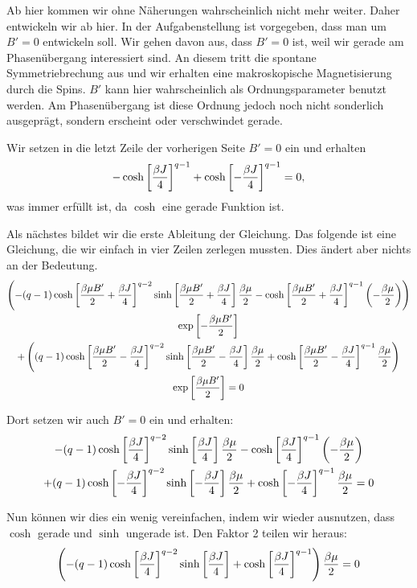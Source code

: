 Ab hier kommen wir ohne Näherungen wahrscheinlich nicht mehr weiter. Daher
entwickeln wir ab hier. In der Aufgabenstellung ist vorgegeben, dass man um $B'
= 0$ entwickeln soll. Wir gehen davon aus, dass $B' = 0$ ist, weil wir gerade
am Phasenübergang interessiert sind. An diesem tritt die spontane
Symmetriebrechung aus und wir erhalten eine makroskopische Magnetisierung durch
die Spins. $B'$ kann hier wahrscheinlich als Ordnungsparameter benutzt werden.
Am Phasenübergang ist diese Ordnung jedoch noch nicht sonderlich ausgeprägt,
sondern erscheint oder verschwindet gerade.

Wir setzen in die letzt Zeile der vorherigen Seite $B' = 0$ ein und erhalten
\[
    - \cosh\sbr{\frac{\beta J}4}^{q-1} + \cosh\sbr{-\frac{\beta J}4}^{q-1} = 0,
\]
was immer erfüllt ist, da $\cosh$ eine gerade Funktion ist.

Als nächstes bildet wir die erste Ableitung der Gleichung. Das folgende ist
eine Gleichung, die wir einfach in vier Zeilen zerlegen mussten. Dies ändert
aber nichts an der Bedeutung.
\begin{multline*}
    \del{
        - (q-1) \cosh\sbr{\frac{\beta \mu B'}2 + \frac{\beta J}4}^{q-2}
        \sinh\sbr{\frac{\beta \mu B'}2 + \frac{\beta J}4}
        \frac{\beta \mu}2
        - \cosh\sbr{\frac{\beta \mu B'}2 + \frac{\beta J}4}^{q-1}
        \del{- \frac{\beta \mu}2}
    } \\
    \exp\sbr{- \frac{\beta \mu B'}2} \\
    +
    \del{
        (q-1) \cosh\sbr{\frac{\beta \mu B'}2 - \frac{\beta J}4}^{q-2}
        \sinh\sbr{\frac{\beta \mu B'}2 - \frac{\beta J}4}
        \frac{\beta \mu}2
        + \cosh\sbr{\frac{\beta \mu B'}2 - \frac{\beta J}4}^{q-1}
        \frac{\beta \mu}2
    }
    \\
    \exp\sbr{\frac{\beta \mu B'}2}
    = 0
\end{multline*}

Dort setzen wir auch $B'=0$ ein und erhalten:
\begin{multline*}
    - (q-1) \cosh\sbr{\frac{\beta J}4}^{q-2}
    \sinh\sbr{\frac{\beta J}4}
    \frac{\beta \mu}2
    - \cosh\sbr{\frac{\beta J}4}^{q-1}
    \del{- \frac{\beta \mu}2}
    \\
    +
    (q-1) \cosh\sbr{- \frac{\beta J}4}^{q-2}
    \sinh\sbr{- \frac{\beta J}4}
    \frac{\beta \mu}2
    + \cosh\sbr{- \frac{\beta J}4}^{q-1}
    \frac{\beta \mu}2
    = 0
\end{multline*}

Nun können wir dies ein wenig vereinfachen, indem wir wieder ausnutzen, dass
$\cosh$ gerade und $\sinh$ ungerade ist. Den Faktor 2 teilen wir heraus:
\[
    \del{
        - (q-1) \cosh\sbr{\frac{\beta J}4}^{q-2}
        \sinh\sbr{\frac{\beta J}4}
        + \cosh\sbr{\frac{\beta J}4}^{q-1}
    }
    \frac{\beta \mu}2
    = 0
\]

